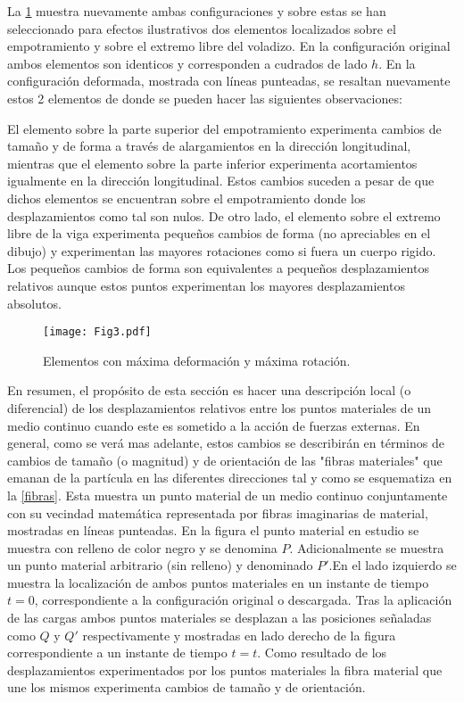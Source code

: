 \documentclass[../notas medios.tex]{subfiles}
\begin{document}
La \cref{viga3} muestra nuevamente ambas configuraciones y sobre estas se han seleccionado para efectos ilustrativos dos elementos localizados sobre el empotramiento y sobre el extremo libre del voladizo. En la configuración original ambos elementos son identicos y corresponden a cudrados de lado $h$. En la configuración deformada, mostrada con líneas punteadas, se resaltan nuevamente estos 2 elementos de donde se pueden hacer las siguientes observaciones:

El elemento sobre la parte superior del empotramiento experimenta cambios de tamaño y de forma a través de alargamientos en la dirección longitudinal, mientras que el elemento sobre la parte inferior experimenta acortamientos igualmente en la dirección longitudinal. Estos cambios suceden a pesar de que dichos elementos se encuentran sobre el empotramiento donde los desplazamientos como tal son nulos. De otro lado, el elemento sobre el extremo libre de la viga experimenta pequeños cambios de forma  (no apreciables en el dibujo) y experimentan las mayores rotaciones como si fuera un cuerpo rigido. Los pequeños cambios de forma son equivalentes a pequeños desplazamientos relativos aunque estos puntos experimentan los mayores desplazamientos absolutos.


\begin{figure}[H]
\centering
	\texttt{[image: Fig3.pdf]}
	\caption{Elementos con máxima deformación y máxima rotación.}
	\label{viga3}
\end{figure}

En resumen, el propósito de esta sección es hacer una descripción local (o diferencial) de los desplazamientos relativos entre los puntos materiales de un medio continuo cuando este es sometido a la acción de fuerzas externas. En general, como se verá mas adelante, estos cambios se describirán en términos de cambios de tamaño (o magnitud) y de orientación de las "fibras materiales" que emanan de la partícula en las diferentes direcciones tal y como se esquematiza en la \cref{fibras}. Esta muestra un punto material de un medio continuo conjuntamente con su vecindad matemática representada por fibras imaginarias de material, mostradas en líneas punteadas. En la figura el punto material en estudio se muestra con relleno de color negro y se denomina $P$. Adicionalmente se muestra un punto material arbitrario (sin relleno) y denominado $P'$.En el lado izquierdo se muestra la localización de ambos puntos materiales en un instante de tiempo $t=0$, correspondiente a la configuración original o descargada. Tras la aplicación de las cargas ambos puntos materiales se desplazan a las posiciones señaladas como $Q$ y $Q'$ respectivamente y mostradas en lado derecho de la figura correspondiente a un instante de tiempo $t=t$. Como resultado de los desplazamientos experimentados por los puntos materiales la fibra material que une los mismos experimenta cambios de tamaño y de orientación.
\end{document}

